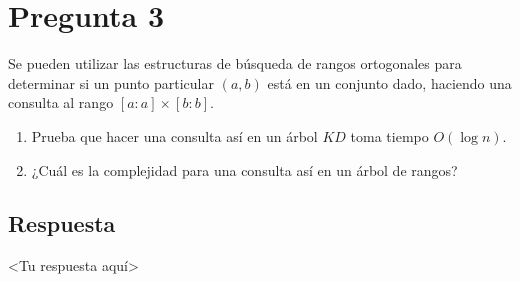 \section*{Pregunta 3}
\noindent Se pueden utilizar las estructuras de búsqueda de rangos ortogonales para determinar si un punto particular $(a,b)$ está en un conjunto dado, haciendo una consulta al rango $[a:a] \times [b:b]$.
\begin{enumerate}
   \item Prueba que hacer una consulta así en un árbol $KD$ toma tiempo $O(\log n)$.
   \item ¿Cuál es la complejidad para una consulta así en un árbol de rangos?
\end{enumerate}

\subsection*{Respuesta}
<Tu respuesta aquí>

\bigskip
